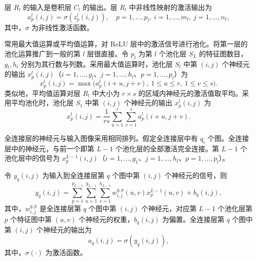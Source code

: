 
层 $R_l$ 的输入是卷积层 $C_l$ 的输出。层 $R_l$ 中非线性映射的激活输出为
\begin{equation}
a_p^l(i,j)=\sigma(z_p^l(i,j)),\quad p=1,\ldots,p_l,\ i=1,\ldots,m_l,\ j=1,\ldots,n_l,
\tag{6.106}
\end{equation}
其中，$\sigma$ 为非线性激活函数。


常用最大值运算或平均值运算，对 ReLU 层中的激活信号进行池化。将第一层的池化运算推广到一般的第 $l$ 层很直接。令 $p_l$ 为第 $l$ 个池化层 $S_L$ 的特征图数目，$g_l,h_l$ 分别为其行数与列数。采用最大值运算时，池化层 $S_l$ 中第 $(i,j)$ 个神经元的输出 $x_p^l(i,j)$（$i=1,\ldots,g_l$、$j=1,\ldots,h_l$、$p=1,\ldots,p_l$）为
\begin{equation}
x_p^l(i,j)=\max\bigl(a_p^l(i+u,j+v),\ 1\leq u\leq r,\ 1\leq v\leq s\bigr).
\tag{6.107}
\end{equation}
类似地，平均值运算对层 $R_l$ 中大小为 $r\times s$ 的区域内神经元的激活值取平均。采用平均池化时，池化层 $S_1$ 中第 $(i,j)$ 个神经元的输出 $x_p^l(i,j)$ 为
\begin{equation}
x_p^l(i,j)=\frac1{rs}\sum_{u=1}^r\sum_{v=1}^sa_p^l(i+u,j+v).
\tag{6.108}
\end{equation}


全连接层的神经元与输入图像采用相同排列。假定全连接层中有 $q_i$ 个图。全连接层中的神经元，与前一个即第 $L-1$ 个池化层的全部激活完全连接。第 $L-1$ 个池化层中的信号为 $x_p^{L-1}(i,j)$（$i=1,\ldots,g_1$、$j=1,\ldots,h_l$、$p=1,\ldots,p_l$）。

令 $y_q(i,j)$ 为输入到全连接层第 $q$ 个图中第 $(i,j)$ 个神经元的信号，则
\begin{equation}
y_q(i,j)=\sum_{p=1}^{p_{L-1}}\sum_{u=1}^{g_{L-1}}\sum_{v=1}^{h_{L-1}}w_{i,j}^{q,p}(u,v)x_p^{L-1}(u,v)+b_q(i,j),
\tag{6.109}
\end{equation}
其中，$w_{i,j}^{q,p}$ 是全连接层第 $q$ 个图中第 $(i,j)$ 个神经元，对应第 $L-1$ 个池化层第 $p$ 个特征图中第 $(u,v)$ 个神经元的权重，$b_q(i,j)$ 为偏置。全连接层第 $q$ 个图中第 $(i,j)$ 个神经元的输出为
\begin{equation}
a_q(i,j)=\sigma(y_q(i,j)),
\tag{6.110}
\end{equation}
其中，$\sigma(\cdot)$ 为激活函数。

